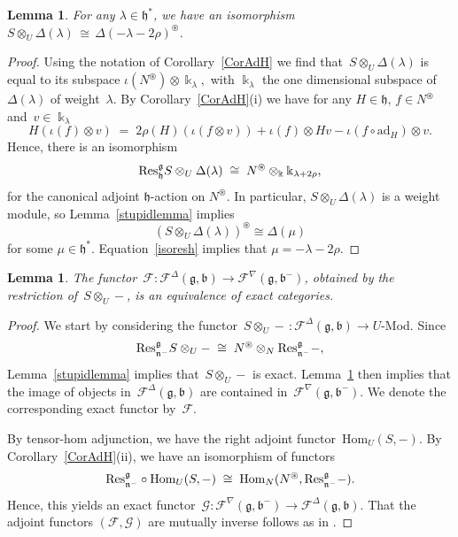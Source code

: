 \documentclass[11pt]{amsart}
\newcommand{\FF}{\mathscr{F}}
\newcommand{\GG}{\mathscr{G}}
\newcommand{\cF}{{\mathcal{F}}}
\newcommand{\ad}{\mathrm{ad}}
\newcommand{\Hom}{\mathrm{Hom}}
\newcommand{\mk}{\Bbbk}
\newcommand{\fn}{\mathfrak{n}}
\newcommand{\fg}{\mathfrak{g}}
\newcommand{\fh}{\mathfrak{h}}
\newcommand{\fb}{\mathfrak{b}}
\numberwithin{equation}{section}
\theoremstyle{plain}
\newtheorem{lemma}[subsubsection]{Lemma}
\theoremstyle{remark}
\theoremstyle{remark}
\theoremstyle{construction}
\newcommand{\res}{{\rm Res}}
\begin{document}
\begin{lemma}\label{TwistVerma}
For any $\lambda\in\fh^\ast$, we have an isomorphism $S\otimes_U\Delta(\lambda)\,\cong\,\Delta(-\lambda-2\rho)^{\circledast}$.
\end{lemma}
\begin{proof}
Using the notation of Corollary~\ref{CorAdH} we find that~$S\otimes_U\Delta(\lambda)$ is equal to its subspace
$\iota(N^{\circledast})\otimes \mk_\lambda,$
with $\mk_\lambda$ the one dimensional subspace of~$\Delta(\lambda)$ of weight~$\lambda$. By Corollary~\ref{CorAdH}(i) we have for any $H\in\fh$, $f\in N^\circledast$ and~$v\in \mk_\lambda$
$$H(\iota(f)\otimes v)\;=\; 2\rho(H)(\iota(f\otimes v))+\iota(f)\otimes Hv-\iota(f\circ\ad_H)\otimes v.$$
Hence, {there is} an isomorphism
\begin{equation}\label{isoresh}\res^{\fg}_{\fh}S\otimes_U\Delta(\lambda)\;\cong\; N^{\circledast}\otimes_{\mk}\mk_{\lambda+2\rho},\end{equation}
for the canonical adjoint $\fh$-action on $N^{\circledast}$.
In particular, $S\otimes_U\Delta(\lambda)$ is a weight module, so Lemma~\ref{stupidlemma} implies
$$(S\otimes_U\Delta(\lambda))^{\circledast}\cong \Delta(\mu)$$ for some $\mu\in\fh^\ast$. Equation~\eqref{isoresh} implies that $\mu=-\lambda-2\rho$.
\end{proof}


\begin{lemma}\label{LemFF}
The functor~$\FF:\cF^\Delta(\fg,\fb)\to \cF^{\nabla}(\fg,\fb^-)$, obtained by the restriction of~$S\otimes_U-$, is an equivalence of exact categories.
\end{lemma}
\begin{proof}
We start by considering the functor~$S\otimes_U-\,:\cF^\Delta(\fg,\fb)\to U$-Mod. Since 
$$\res^{\fg}_{\fn^-}S\otimes_U-\;\cong \;N^{\circledast}\otimes_N\res^{\fg}_{\fn^-}-,$$ Lemma~\ref{stupidlemma} implies that~$S\otimes_U-$ is exact. Lemma~\ref{TwistVerma} then implies that the image of objects in~$\cF^\Delta(\fg,\fb)$ are contained in~$ \cF^{\nabla}(\fg,\fb^-)$. We denote the corresponding exact functor by~$\FF$.

By tensor-hom adjunction, we have the right adjoint functor~$\Hom_U(S,-)$. By Corollary~\ref{CorAdH}(ii), we have an isomorphism of functors
$$\res^{\fg}_{\fn^-}\circ\Hom_{U}(S,-)\;\cong\; \Hom_{N}(N^{\circledast},\res^{\fg}_{\fn^-}-).$$
Hence, this yields an exact functor~$\GG: \cF^{\nabla}(\fg,\fb^-)\to \cF^\Delta(\fg,\fb)$. That the adjoint {functors} $(\FF,\GG)$ are mutually inverse follows as in \cite[Theorem~2.1]{Soergel}.
\end{proof}
\end{document}
